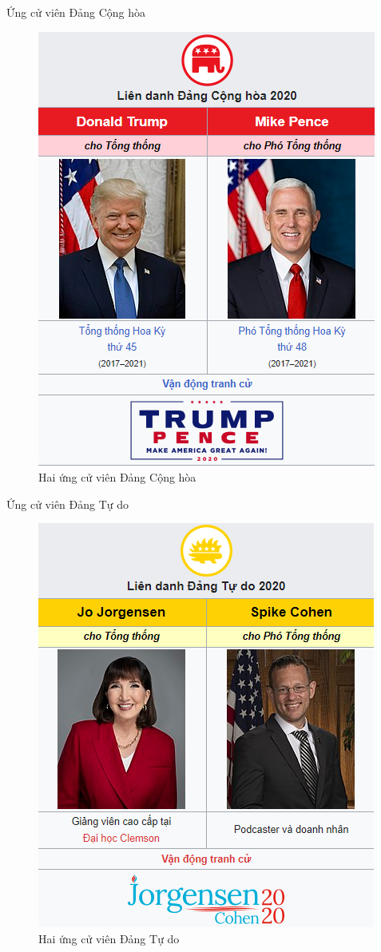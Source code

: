 \documentclass[10pt]{beamer}
\theoremstyle{remark}
\theoremstyle{definition}
\begin{document}
\begin{frame}{Ứng cử viên Đảng Cộng hòa}
    \begin{figure}[h!]
        \centering
        \includegraphics[height=0.8\textheight]{figures/Rep_Candidates.png}
        \caption{Hai ứng cử viên Đảng Cộng hòa}
    \end{figure}
\end{frame}

\begin{frame}{Ứng cử viên Đảng Tự do}
    \begin{figure}[h!]
        \centering
        \includegraphics[height=0.8\textheight]{figures/Lib_Candidates.png}
        \caption{Hai ứng cử viên Đảng Tự do}
    \end{figure}
\end{frame}
\end{document}
